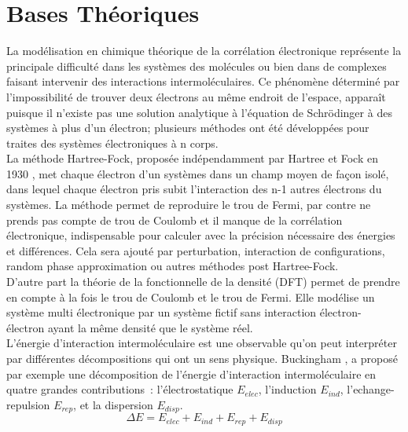 \newpage

\section{Bases Théoriques}

La modélisation en chimique théorique de la corrélation électronique représente la principale difficulté dans les systèmes des molécules ou bien dans de complexes faisant intervenir des interactions intermoléculaires. Ce phénomène déterminé par l’impossibilité de trouver deux électrons au même endroit de l’espace, apparaît puisque il n’existe pas une solution analytique à l’équation de  Schrödinger à des systèmes à plus d’un électron; plusieurs méthodes ont été développées pour traites des systèmes électroniques à n corps.\\

La méthode Hartree-Fock, proposée indépendamment par Hartree et Fock en 1930 \cite{slater1930note}, met chaque électron d’un systèmes dans un champ moyen de façon isolé, dans lequel chaque électron pris subit l’interaction des n-1 autres électrons du systèmes. La méthode permet de reproduire le trou de Fermi, par contre ne prends pas compte de trou de Coulomb et il manque de la corrélation électronique, indispensable pour calculer avec la précision nécessaire des énergies et différences. Cela sera ajouté par perturbation, interaction de configurations, random phase approximation ou autres méthodes post Hartree-Fock.\\

D'autre part la théorie de la fonctionnelle de la densité (DFT) permet de prendre en compte à la fois le trou de Coulomb et le trou de Fermi. Elle modélise un système multi électronique par un système fictif sans interaction électron- électron  ayant la même densité que le système réel.\\

L’énergie d’interaction intermoléculaire est une observable qu’on peut interpréter par différentes décompositions qui ont un sens physique. Buckingham \cite{buckingham1967permanent}, a proposé par exemple une décomposition de l’énergie d’interaction intermoléculaire en quatre grandes contributions : l’électrostatique $E_{elec}$, l’induction $E_{ind}$, l’echange-repulsion $E_{rep}$, et la dispersion $E_{disp}$.\\

\begin{equation}
\Delta E = E_{elec} + E_{ind} + E_{rep} + E_{disp}
\end{equation} 

